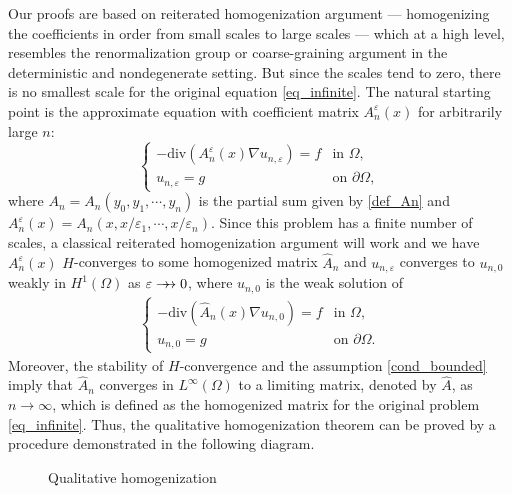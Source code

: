 \documentclass[reqno,12pt]{amsart} %
\theoremstyle{definition}
\theoremstyle{remark}
\numberwithin{equation}{section}
\newcommand{\e}{\varepsilon}
\newcommand{\doublerightarrow}{%
  \mathrel{%
    \mathchoice
      {\rightarrow\mspace{-10mu}\rightarrow} %
      {\rightarrow\mspace{-10mu}\rightarrow} %
      {\rightarrow\mspace{-10mu}\rightarrow} %
      {\rightarrow\mspace{-10mu}\rightarrow} %
  }%
}
\begin{document}
Our proofs are  based on reiterated homogenization argument --- homogenizing the coefficients in order from small scales to large scales --- which at a high level, resembles the renormalization group or coarse-graining argument in the deterministic and nondegenerate setting. But since the scales tend to zero, there is no smallest scale for the original equation \eqref{eq_infinite}. The natural starting point is the approximate equation with coefficient matrix $A_n^\e(x)$ for arbitrarily large $n$:
\begin{equation}
  \label{eq_approximate}
  \begin{cases}
    -\mathrm{div}(A_n^{\varepsilon}(x)\nabla u_{n, \varepsilon})=f&\text{in }\Omega,\\
        u_{n, \varepsilon}=g& \text{on }\partial\Omega,
  \end{cases}
\end{equation}
where $A_n = A_n(y_0,y_1,\cdots, y_n)$ is the partial sum given by \eqref{def_An} and $A_n^\e(x) = A_n(x,x/\e_1,\cdots, x/\e_n)$.
Since this problem has a finite number of scales,  a classical reiterated homogenization argument will work and we have $A_n^\e(x)$ $H$-converges to some homogenized matrix $\widehat{A}_n$ and $u_{n,\e}$ converges to $u_{n,0}$ weakly in $H^1(\Omega)$ as $\e \doublerightarrow 0$, where $u_{n,0}$ is the weak solution of
\begin{align}\label{eq_approx_homo}
  \begin{cases}
    -\mathrm{div}(\widehat{A}_n(x)\nabla u_{n, 0})=f&\text{in }\Omega, \\
    u_{n,0}=g &\text{on }\partial\Omega. 
  \end{cases}
\end{align}
Moreover, the stability of $H$-convergence and the assumption \eqref{cond_bounded} imply that $\widehat{A}_n$ converges in $L^\infty(\Omega)$ to a limiting matrix, denoted by $\widehat{A}$, as $n\to \infty$, which is defined as the homogenized matrix for the original problem \eqref{eq_infinite}. Thus, the qualitative homogenization theorem can be proved by a procedure demonstrated in the following diagram.
\begin{figure}[h]
    \centering
    \caption{Qualitative homogenization}
    \label{fig:Qualitative}
\end{figure}
\end{document}
